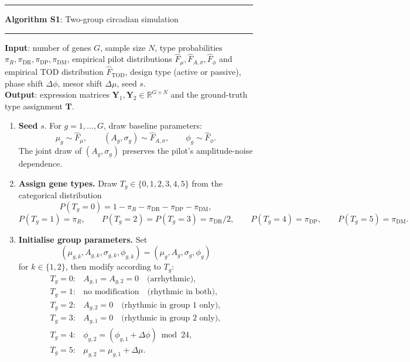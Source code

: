 \documentclass{article}
\begin{document}
\begin{figure}[!htbp]
\small
\hrule\vspace{4pt}
\textbf{Algorithm S1}: Two-group circadian simulation \vspace{2pt}
\hrule\vspace{4pt}
\textbf{Input}: number of genes $G$, sample size $N$, type probabilities
$\pi_R, \pi_{\mathrm{DR}}, \pi_{\mathrm{DP}}, \pi_{\mathrm{DM}}$,
empirical pilot distributions
$\hat{F}_\mu, \hat{F}_{A,\sigma}, \hat{F}_\phi$ and empirical TOD
distribution $\hat{F}_{\mathrm{TOD}}$, design type (active or passive),
phase shift $\Delta\phi$, mesor shift $\Delta\mu$, seed $s$.\\
\textbf{Output}: expression matrices
$\mathbf{Y}_1, \mathbf{Y}_2 \in \mathbb{R}^{G \times N}$ and the
ground-truth type assignment $\mathbf{T}$.
\vspace{4pt}

\begin{enumerate}
\setlength{\itemsep}{2pt}

\item \textbf{Seed} $s$. For $g=1,\ldots,G$, draw baseline parameters:
\[
\mu_g \sim \hat{F}_\mu,
\qquad
(A_g,\sigma_g) \sim \hat{F}_{A,\sigma},
\qquad
\phi_g \sim \hat{F}_\phi.
\]
The joint draw of $(A_g,\sigma_g)$ preserves the pilot's
amplitude-noise dependence.

\item \textbf{Assign gene types.} Draw
$T_g \in \{0,1,2,3,4,5\}$ from the categorical distribution
\[
P(T_g=0)
=
1-\pi_R-\pi_{\mathrm{DR}}-\pi_{\mathrm{DP}}-\pi_{\mathrm{DM}},
\]
\[
P(T_g=1)=\pi_R,
\qquad
P(T_g=2)=P(T_g=3)=\pi_{\mathrm{DR}}/2,
\qquad
P(T_g=4)=\pi_{\mathrm{DP}},
\qquad
P(T_g=5)=\pi_{\mathrm{DM}}.
\]

\item \textbf{Initialise group parameters.} Set
\[
(\mu_{g,k},A_{g,k},\sigma_{g,k},\phi_{g,k})
=
(\mu_g,A_g,\sigma_g,\phi_g)
\]
for $k\in\{1,2\}$, then modify according to $T_g$:
\[
\begin{array}{ll}
T_g=0: & A_{g,1}=A_{g,2}=0 \quad \text{(arrhythmic)},\\
T_g=1: & \text{no modification} \quad \text{(rhythmic in both)},\\
T_g=2: & A_{g,2}=0 \quad \text{(rhythmic in group 1 only)},\\
T_g=3: & A_{g,1}=0 \quad \text{(rhythmic in group 2 only)},\\
T_g=4: & \phi_{g,2}=(\phi_{g,1}+\Delta\phi)\bmod 24,\\
T_g=5: & \mu_{g,2}=\mu_{g,1}+\Delta\mu.
\end{array}
\]


\end{enumerate}
\end{figure}
\end{document}
